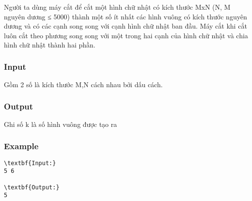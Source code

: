 



   Người ta dùng máy cắt để cắt một hình chữ nhật có kích thước MxN (N, M nguyên dương ≤ 5000) thành một số ít nhất các hình vuông có kích thước nguyên dương và có các cạnh song song với cạnh hình chữ nhật ban đầu. Máy cắt khi cắt luôn cắt theo phương song song với một trong hai cạnh của hình chữ nhật và chia hình chữ nhật thành hai phần.  

\subsubsection{   Input  }

   Gồm 2 số là kích thước M,N cách nhau bởi dấu cách.  

\subsubsection{   Output  }

   Ghi số k là số hình vuông được tạo ra  

\subsubsection{   Example  }
\begin{verbatim}
\textbf{Input:}
5 6

\textbf{Output:}
5
\end{verbatim}